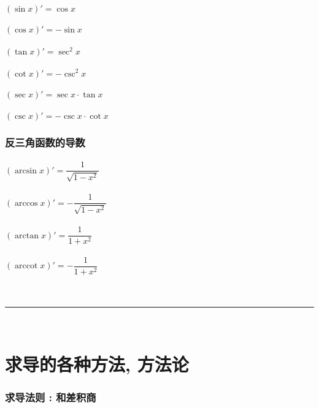 \documentclass[UTF8]{ctexart}
\begin{document}
\subsection{$(\sin x)' = \cos x$}

\subsection{$(\cos x)' = -\sin x$}

\subsection{$(\tan x)' = \sec^2 x$}

\subsection{$(\cot x)' = -\csc^2 x$}

\subsection{$(\sec x)' = \sec x  \cdot \tan x$}

\subsection{ $(\csc x)' = - \csc x \cdot \cot x$}





\section{反三角函数的导数}

\subsection{$(\arcsin x)' = \dfrac{1} {\sqrt{1-x^2}}$}

\subsection{$(\arccos x)' = - \dfrac{1} {\sqrt{1-x^2}}$}

\subsection{$(\arctan x)' =  \dfrac{1} {1 + x^2}$}

\subsection{$(\operatorname{arccot}  x)' = - \dfrac{1} {1 + x^2}$}


~\\
\hrule
~\\


\part{求导的各种方法, 方法论}

\section{求导法则 : 和差积商}
\end{document}
